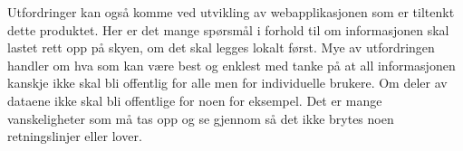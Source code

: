 Utfordringer kan også komme ved utvikling av webapplikasjonen som er tiltenkt dette produktet. Her er det mange spørsmål i forhold til om informasjonen skal lastet rett opp på skyen, om det skal legges lokalt først. Mye av utfordringen handler om hva som kan være best og enklest med tanke på at all informasjonen kanskje ikke skal bli offentlig for alle men for individuelle brukere. Om deler av dataene ikke skal bli offentlige for noen for eksempel. Det er mange vanskeligheter som må tas opp og se gjennom så det ikke brytes noen retningslinjer eller lover.

